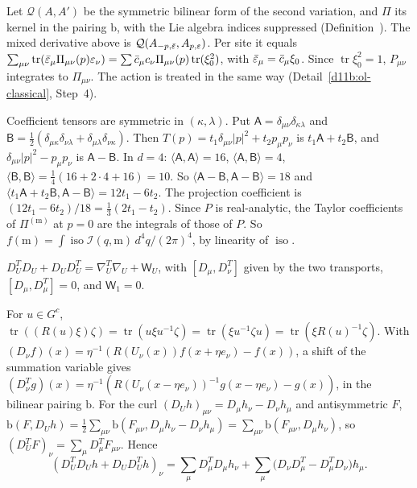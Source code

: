 \begin{step}
Let $\mathcal Q(A,A')$ be the symmetric bilinear form of the second variation, and $\Pi$ its kernel in the pairing $\mathrm b$, with the Lie algebra indices suppressed (Definition~). The mixed derivative above is $\mathcal Q(A_{-p,\bar{\varepsilon}},A_{p,\varepsilon})$. Per site it equals $\sum_{\mu\nu}\operatorname{tr}(\bar{\varepsilon}_\mu\Pi_{\mu\nu}(p)\varepsilon_\nu)=\sum\bar c_\mu c_\nu\Pi_{\mu\nu}(p)\operatorname{tr}(\xi_0^2)$, with $\bar{\varepsilon}_\mu=\bar c_\mu\xi_0$. Since $\operatorname{tr}\xi_0^2=1$, $P_{\mu\nu}$ integrates to $\Pi_{\mu\nu}$. The action is treated in the same way (Detail~\ref{d11b:ol-classical}, Step~4).
\end{step}

\begin{step}
Coefficient tensors are symmetric in $(\kappa,\lambda)$. Put $\mathsf A=\delta_{\mu\nu}\delta_{\kappa\lambda}$ and $\mathsf B=\frac12(\delta_{\mu\kappa}\delta_{\nu\lambda}+\delta_{\mu\lambda}\delta_{\nu\kappa})$. Then $T(p)=t_1\delta_{\mu\nu}|p|^2+t_2p_\mu p_\nu$ is $t_1\mathsf A+t_2\mathsf B$, and $\delta_{\mu\nu}|p|^2-p_\mu p_\nu$ is $\mathsf A-\mathsf B$. In $d=4$: $\langle\mathsf A,\mathsf A\rangle=16$, $\langle\mathsf A,\mathsf B\rangle=4$, $\langle\mathsf B,\mathsf B\rangle=\frac14(16+2\cdot4+16)=10$. So $\langle\mathsf A-\mathsf B,\mathsf A-\mathsf B\rangle=18$ and $\langle t_1\mathsf A+t_2\mathsf B,\mathsf A-\mathsf B\rangle=12t_1-6t_2$. The projection coefficient is $(12t_1-6t_2)/18=\frac13(2t_1-t_2)$. Since $P$ is real-analytic, the Taylor coefficients of $\Pi^{(\mathrm m)}$ at $p=0$ are the integrals of those of $P$. So $f(\mathrm m)=\int\operatorname{iso}\mathcal I(q,\mathrm m)\,d^4q/(2\pi)^4$, by linearity of $\operatorname{iso}$.
\end{step}

\begin{detail}\label{d11b:weitzenbock}
$D_U^TD_U+D_UD_U^T=\nabla_U^T\nabla_U+\mathsf W_U$, with $[D_\mu,D_\nu^T]$ given by the two transports, $[D_\mu,D_\mu^T]=0$, and $\mathsf W_1=0$.
\end{detail}

\begin{step}[Transposes]
For $u\in G^c$, $\operatorname{tr}((R(u)\xi)\zeta)=\operatorname{tr}(u\xi u^{-1}\zeta)=\operatorname{tr}(\xi u^{-1}\zeta u)=\operatorname{tr}(\xi R(u)^{-1}\zeta)$. With $(D_\nu f)(x)=\eta^{-1}(R(U_\nu(x))f(x+\eta e_\nu)-f(x))$, a shift of the summation variable gives $(D_\nu^Tg)(x)=\eta^{-1}(R(U_\nu(x-\eta e_\nu))^{-1}g(x-\eta e_\nu)-g(x))$, in the bilinear pairing $\mathrm b$. For the curl $(D_Uh)_{\mu\nu}=D_\mu h_\nu-D_\nu h_\mu$ and antisymmetric $F$, $\mathrm b(F,D_Uh)=\frac12\sum_{\mu\nu}\mathrm b(F_{\mu\nu},D_\mu h_\nu-D_\nu h_\mu)=\sum_{\mu\nu}\mathrm b(F_{\mu\nu},D_\mu h_\nu)$, so $(D_U^TF)_\nu=\sum_\mu D_\mu^TF_{\mu\nu}$. Hence
\[
(D_U^TD_Uh+D_UD_U^Th)_\nu=\sum_\mu D_\mu^TD_\mu h_\nu+\sum_\mu\big(D_\nu D_\mu^T-D_\mu^TD_\nu\big)h_\mu .
\]
\end{step}


